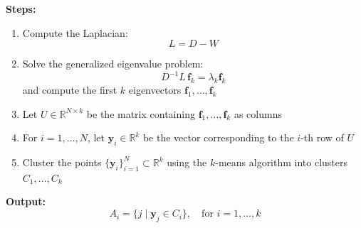 \documentclass[11pt]{article}
\begin{document}
\textbf{Steps:}
\begin{enumerate}
	\item Compute the Laplacian:
	      \[
		      L = D - W
	      \]

	\item Solve the generalized eigenvalue problem:
	      \[
		      D^{-1}L \, \mathbf{f}_k = \lambda_k \mathbf{f}_k
	      \]
	      and compute the first \( k \) eigenvectors \( \mathbf{f}_1, \dots, \mathbf{f}_k \)

	\item Let \( U \in \mathbb{R}^{N \times k} \) be the matrix containing \( \mathbf{f}_1, \dots, \mathbf{f}_k \) as columns

	\item For \( i = 1, \dots, N \), let \( \mathbf{y}_i \in \mathbb{R}^k \) be the vector corresponding to the \( i \)-th row of \( U \)

	\item Cluster the points \( \{ \mathbf{y}_i \}_{i=1}^N \subset \mathbb{R}^k \) using the \( k \)-means algorithm into clusters \( C_1, \dots, C_k \)
\end{enumerate}

\textbf{Output:}
\[
	A_i = \{ j \mid \mathbf{y}_j \in C_i \}, \quad \text{for } i = 1, \dots, k
\]
\end{document}
